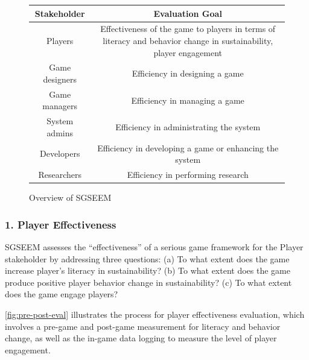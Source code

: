 \documentclass{sigchi}
\newcommand\tabhead[1]{\small\textbf{#1}}
\begin{document}
\begin{figure}
  \centering
  \begin{tabular}{|c|c|}
    \hline
    \multicolumn{1}{|p{0.3\columnwidth}|}{\centering\tabhead{Stakeholder}} &
    \multicolumn{1}{|p{0.65\columnwidth}|}{\centering\tabhead{Evaluation Goal}} \\
    \hline
    \multicolumn{1}{|p{0.3\columnwidth}|}{Players} &
    \multicolumn{1}{|p{0.65\columnwidth}|}{Effectiveness of the game
      to players in terms of literacy and behavior change in
      sustainability, player engagement} \\ 
    \hline
    \multicolumn{1}{|p{0.3\columnwidth}|}{Game designers} & \multicolumn{1}{|p{0.65\columnwidth}|}{Efficiency in designing a game} \\
    \hline
    \multicolumn{1}{|p{0.3\columnwidth}|}{Game managers} & \multicolumn{1}{|p{0.65\columnwidth}|}{Efficiency in managing a game} \\
    \hline
    \multicolumn{1}{|p{0.3\columnwidth}|}{System admins} & \multicolumn{1}{|p{0.65\columnwidth}|}{Efficiency in administrating the system} \\
    \hline
    \multicolumn{1}{|p{0.3\columnwidth}|}{Developers} & \multicolumn{1}{|p{0.65\columnwidth}|}{Efficiency in developing a game or enhancing the system} \\
    \hline
    \multicolumn{1}{|p{0.3\columnwidth}|}{Researchers} & \multicolumn{1}{|p{0.65\columnwidth}|}{Efficiency in performing research} \\
    \hline
  \end{tabular}
  \caption{Overview of SGSEEM}
  \label{fig:evaluation-framework}
\end{figure}

\subsubsection{1. Player Effectiveness}

SGSEEM assesses the ``effectiveness'' of a serious game framework for the
Player stakeholder by addressing three questions: (a) To what extent does the game
increase player's literacy in sustainability? (b) To what extent does
the game produce positive player behavior change in sustainability?
(c) To what extent does the game engage players?

\autoref{fig:pre-post-eval} illustrates the process for player
effectiveness evaluation, which involves a pre-game and post-game
measurement for literacy and behavior change, as well as the in-game
data logging to measure the level of player engagement.
\end{document}

